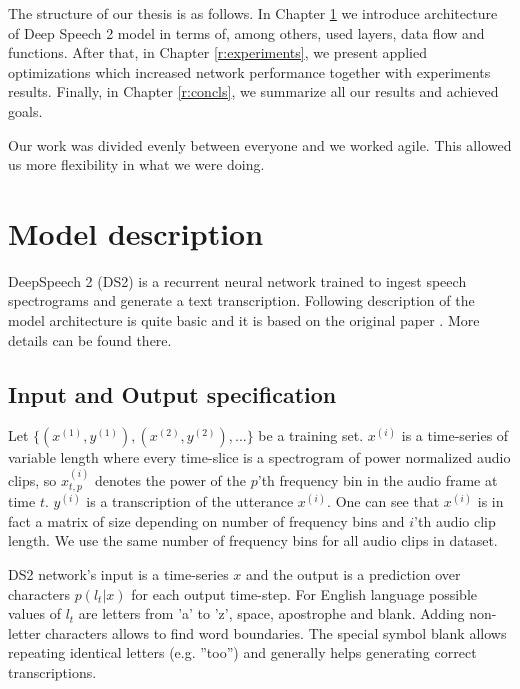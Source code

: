 \documentclass[licencjacka,en]{pracamgr}
\begin{document}
The structure of our thesis is as follows. In Chapter \ref{r:desc} we introduce architecture of Deep Speech 2 model in terms of, among others, used layers, data flow and functions. After that, in Chapter \ref{r:experiments}, we present applied optimizations which increased network performance together with experiments results. Finally, in Chapter \ref{r:concls}, we summarize all our results and achieved goals.

Our work was divided evenly between everyone and we worked agile. This allowed us more flexibility in what we were doing.

\chapter{Model description}\label{r:desc}

DeepSpeech 2 (DS2) is a recurrent neural network trained to ingest speech spectrograms and generate a text transcription.
Following description of the model architecture is quite basic and it is based on the original paper \cite{DS2}. More details can be found there.

\section{Input and Output specification} \label{sec:input}
Let $\{(x^{(1)}, y^{(1)}), (x^{(2)}, y^{(2)}), ...\}$ be a training set. $x^{(i)}$ is a time-series of variable length where every time-slice is a spectrogram of power
normalized audio clips, so $x^{(i)}_{t,p}$ denotes the power of the $p$’th frequency bin in the audio frame at time $t$. $y^{(i)}$ is a transcription of the utterance $x^{(i)}$. One can see that $x^{(i)}$ is in fact a matrix of size depending on number of frequency bins and $i$'th audio clip length. We use the same number of frequency bins for all audio clips in dataset.

DS2 network's input is a time-series $x$ and the output is a prediction over characters $p(l_t|x)$ for each output time-step. For English language possible values of $l_t$ are letters from 'a' to 'z', space, apostrophe and blank. Adding non-letter characters allows to find word boundaries. The special symbol blank allows repeating identical letters (e.g. ''too'') and generally helps generating correct transcriptions.
\end{document}
